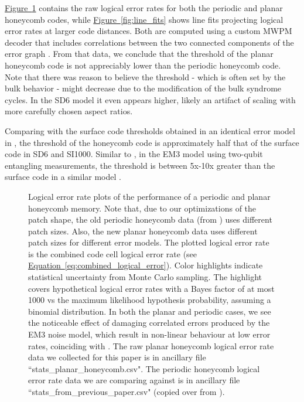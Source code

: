 \documentclass[onecolumn,a4paper,accepted=2022-09-12]{quantumarticle}
\theoremstyle{definition}
\theoremstyle{definition}
\theoremstyle{definition}
\newcommand{\eq}[1]{\hyperref[eq:#1]{Equation~\ref*{eq:#1}}}
\newcommand{\fig}[1]{\hyperref[fig:#1]{Figure~\ref*{fig:#1}}}
\begin{document}
\fig{thresholds} contains the raw logical error rates for both the periodic and planar honeycomb codes, while \fig{line_fits} shows line fits projecting logical error rates at larger code distances.
Both are computed using a custom MWPM decoder that includes correlations between the two connected components of the error graph \cite{gidney2021honeycombmemory, fowler2013optimal}. 
From that data, we conclude that the threshold of the planar honeycomb code is not appreciably lower than the periodic honeycomb code.  
Note that there was reason to believe the threshold - which is often set by the bulk behavior - might decrease due to the modification of the bulk syndrome cycles.
In the SD6 model it even appears higher, likely an artifact of scaling with more carefully chosen aspect ratios.

Comparing with the surface code thresholds obtained in an identical error model in \cite{gidney2021honeycombmemory}, the threshold of the honeycomb code is approximately half that of the surface code in SD6 and SI1000.
Similar to \cite{gidney2021honeycombmemory}, in the EM3 model using two-qubit entangling measurements, the threshold is between 5x-10x greater than the surface code in a similar model \cite{chao2020optimization}.

\begin{figure}[ht!]
    \centering
    \caption{
    Logical error rate plots of the performance of a periodic and planar honeycomb memory.
    Note that, due to our optimizations of the patch shape, the old periodic honeycomb data (from \cite{gidney2021honeycombmemory}) uses different patch sizes.
    Also, the new planar honeycomb data uses different patch sizes for different error models.
    The plotted logical error rate is the combined code cell logical error rate (see \eq{combined_logical_error}).
    Color highlights indicate statistical uncertainty from Monte Carlo sampling.
    The highlight covers hypothetical logical error rates with a Bayes factor of at most 1000 vs the maximum likelihood hypothesis probability, assuming a binomial distribution.
    In both the planar and periodic cases, we see the noticeable effect of damaging correlated errors produced by the EM3 noise model, which result in non-linear behaviour at low error rates, coinciding with \cite{gidney2021honeycombmemory}.
    The raw planar honeycomb logical error rate data we collected for this paper is in ancillary file ``stats\_planar\_honeycomb.csv".
    The periodic honeycomb logical error rate data we are comparing against is in ancillary file ``stats\_from\_previous\_paper.csv" (copied over from \cite{gidney2021honeycombmemory}).
    }
    \label{fig:thresholds}
\end{figure}
\end{document}
